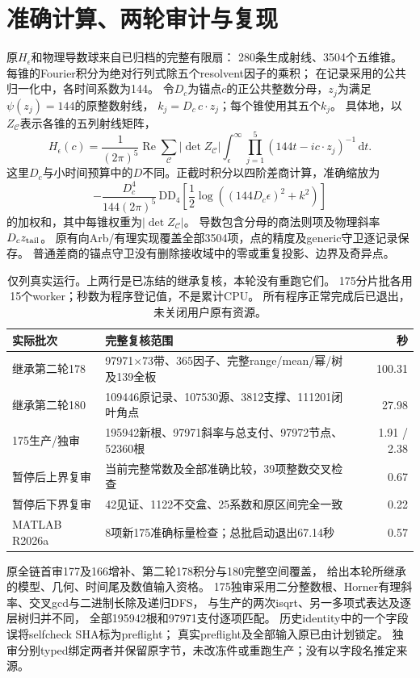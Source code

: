 \documentclass[UTF8,fontset=fandol,zihao=-4,a4paper]{ctexart}
\newcommand{\1}{\mathbf 1}
\newcommand{\dd}{\,\mathrm d}
\begin{document}
\section{准确计算、两轮审计与复现}
原$H_\epsilon$和物理导数球来自已归档的完整有限扇：
280条生成射线、3504个五维锥。
每锥的Fourier积分为绝对行列式除五个resolvent因子的乘积；
在记录采用的公共归一化中，各时间系数为144。
令$D_c$为锚点$c$的正公共整数分母，$z_j$为满足$\psi(z_j)=144$的原整数射线，
$k_j=D_c\,c\cdot z_j$；每个锥使用其五个$k_j$。
具体地，以$Z_{\mathcal C}$表示各锥的五列射线矩阵，
\[
 H_\epsilon(c)=\frac1{(2\pi)^5}\operatorname{Re}
 \sum_{\mathcal C}|\det Z_{\mathcal C}|
 \int_\epsilon^\infty\prod_{j=1}^5(144t-i c\cdot z_j)^{-1}\dd t.
\]
这里$D_c$与小时间预算中的$D$不同。正截时积分以四阶差商计算，准确缩放为
\[ -\frac{D_c^4}{144(2\pi)^5}\,\mathrm{DD}_4\!\left[\frac12\log((144D_c\epsilon)^2+k^2)\right] \]
的加权和，其中每锥权重为$|\det Z_{\mathcal C}|$。
导数包含分母的商法则项及物理斜率$D_cz_{\rm tail}$。
原有向Arb/有理实现覆盖全部3504项，点的精度及generic守卫逐记录保存。
普通差商的锚点守卫没有删除接收域中的零或重复投影、边界及奇异点。

\begin{table}[ht]\centering\small
\begin{tabular}{p{}p{}r}
\toprule 实际批次&完整复核范围&秒\\\midrule
继承第二轮178&97971$\times$73带、365因子、完整range/mean/幂/树及139全板&100.31\\
继承第二轮180&109446原记录、107530源、3812支撑、111201闭叶角点&27.98\\
175生产/独审&195942新根、97971斜率与总支付、97972节点、52360根&1.91 / 2.38\\
暂停后上界复审&当前完整常数及全部准确比较，39项整数交叉检查&0.67\\
暂停后下界复审&42见证、1122不交盒、25系数和原区间完全一致&0.22\\
MATLAB R2026a&8项新175准确标量检查；总批启动退出67.14秒&0.57\\
\bottomrule\end{tabular}
\caption{仅列真实运行。上两行是已冻结的继承复核，本轮没有重跑它们。
175分片批各用15个worker；秒数为程序登记值，不是累计CPU。
所有程序正常完成后已退出，未关闭用户原有资源。}
\end{table}

原全链首审177及166增补、第二轮178积分与180完整空间覆盖，
给出本轮所继承的模型、几何、时间尾及数值输入资格。
175独审采用二分整数根、Horner有理斜率、交叉gcd与二进制长除及递归DFS，
与生产的两次isqrt、另一多项式表达及逐层树归并不同，
全部195942根和97971支付逐项匹配。
历史identity中的一个字段误将selfcheck SHA标为preflight；
真实preflight及全部输入原已由计划锁定。
独审分别typed绑定两者并保留原字节，未改冻件或重跑生产；没有以字段名推定来源。
\end{document}
